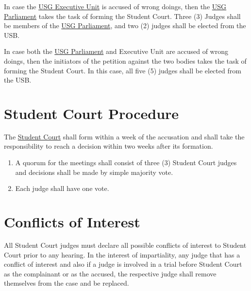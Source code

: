 {\begin{parenum}
	\item In case the \hyperref[USGexecutiveUnitDef]{USG Executive Unit} is accused of wrong doings, then the \hyperref[USGParliamentDef]{USG Parliament} takes the task of forming the Student Court. Three (3) Judges shall be members of the \hyperref[USGParliamentDef]{USG Parliament}, and two (2) judges shall be elected from the USB.
	
	\item In case both the \hyperref[USGParliamentDef]{USG Parliament} and Executive Unit are accused of wrong doings, then the initiators of the petition against the two bodies takes the task of forming the Student Court. In this case, all five (5) judges shall be elected from the USB.
\end{parenum}



\protect\section{Student Court Procedure}
The \protect\hyperref[StudentCourtDef]{Student Court} shall form within a week of the accusation and shall take the responsibility to reach a decision within two weeks after its formation. 
\protect\begin{enumerate}[label={\textbf{\S\arabic*}}]
	\item A quorum for the meetings shall consist of three (3) Student Court judges and decisions shall be made by simple majority vote.
	\item Each judge shall have one vote.
\end{enumerate}


\protect\section{Conflicts of Interest}
All Student Court judges must declare all possible conflicts of interest to Student Court prior to any hearing. In the interest of impartiality, any judge that has a conflict of interest and also if a judge is involved in a trial before Student Court as the complainant or as the accused, the respective judge shall remove themselves from the case and be replaced.
}